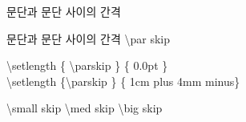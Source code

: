 \documentclass[ aspectratio=149,  10pt,blue,xcolor=pdftex,dvipsnames,table,handout,notes]{beamer}
\begin{document}
		\begin{frame}[t]{문단과 문단 사이의 간격}

			\begin{block} {문단과 문단 사이의 간격}
			\textbackslash par skip
			\end{block}

			\begin{example}
			\textbackslash setlength \{ \textbackslash parskip \} \{ 0.0pt \}\\
			\textbackslash setlength \{\textbackslash parskip \} \{ 1cm plus 4mm minus\}	\\		
			\end{example}

			\begin{example}
			\textbackslash small skip
			\textbackslash med skip
			\textbackslash big skip
			\end{example}

		\note[item]{}
		\end{frame}
\end{document}
